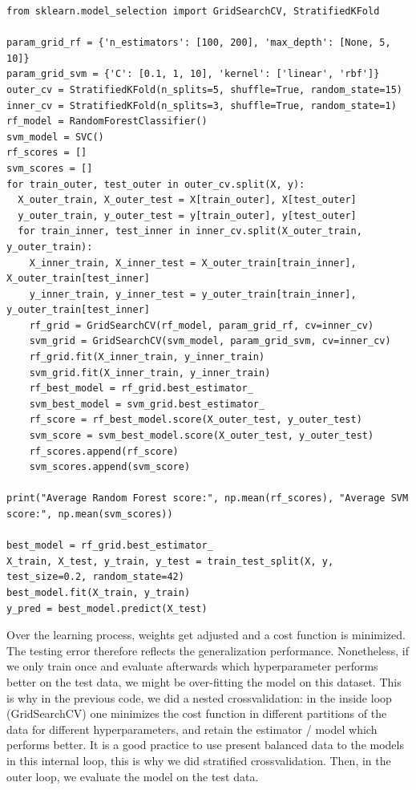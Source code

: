 \documentclass[24pt]{article}
\begin{document}
\begin{lstlisting}  
from sklearn.model_selection import GridSearchCV, StratifiedKFold

param_grid_rf = {'n_estimators': [100, 200], 'max_depth': [None, 5, 10]}
param_grid_svm = {'C': [0.1, 1, 10], 'kernel': ['linear', 'rbf']}
outer_cv = StratifiedKFold(n_splits=5, shuffle=True, random_state=15)
inner_cv = StratifiedKFold(n_splits=3, shuffle=True, random_state=1)
rf_model = RandomForestClassifier()
svm_model = SVC()
rf_scores = []
svm_scores = []
for train_outer, test_outer in outer_cv.split(X, y):
  X_outer_train, X_outer_test = X[train_outer], X[test_outer]
  y_outer_train, y_outer_test = y[train_outer], y[test_outer]
  for train_inner, test_inner in inner_cv.split(X_outer_train, y_outer_train):
    X_inner_train, X_inner_test = X_outer_train[train_inner], X_outer_train[test_inner]
    y_inner_train, y_inner_test = y_outer_train[train_inner], y_outer_train[test_inner]
    rf_grid = GridSearchCV(rf_model, param_grid_rf, cv=inner_cv)
    svm_grid = GridSearchCV(svm_model, param_grid_svm, cv=inner_cv)
    rf_grid.fit(X_inner_train, y_inner_train)
    svm_grid.fit(X_inner_train, y_inner_train)
    rf_best_model = rf_grid.best_estimator_
    svm_best_model = svm_grid.best_estimator_
    rf_score = rf_best_model.score(X_outer_test, y_outer_test)
    svm_score = svm_best_model.score(X_outer_test, y_outer_test)
    rf_scores.append(rf_score)
    svm_scores.append(svm_score)

print("Average Random Forest score:", np.mean(rf_scores), "Average SVM score:", np.mean(svm_scores))

best_model = rf_grid.best_estimator_
X_train, X_test, y_train, y_test = train_test_split(X, y, test_size=0.2, random_state=42)
best_model.fit(X_train, y_train)
y_pred = best_model.predict(X_test)  
\end{lstlisting}  


Over the learning process, weights get adjusted and a cost function is minimized. The testing error therefore reflects the generalization performance. Nonetheless, if we only train once and evaluate afterwards which hyperparameter performs better on the test data, we might be over-fitting the model on this dataset. This is why in the previous code, we did a nested crossvalidation: in the inside loop (GridSearchCV) one minimizes the cost function in different partitions of the data for different hyperparameters, and retain the estimator / model which performs better. It is a good practice to use present balanced data to the models in this internal loop, this is why we did stratified crossvalidation. Then, in the outer loop, we evaluate the model on the test data.
\end{document}
